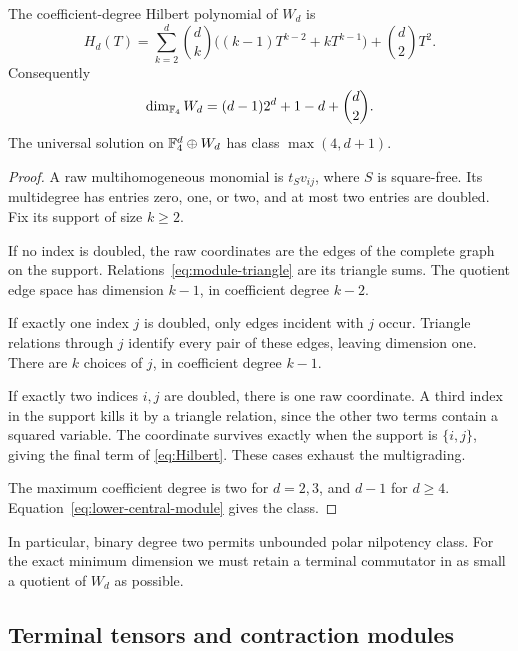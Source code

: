 \begin{proposition}\label{prop:Hilbert}
The coefficient-degree Hilbert polynomial of \(W_d\) is
\begin{equation}\label{eq:Hilbert}
 H_d(T)=\sum_{k=2}^d\binom dk
       \bigl((k-1)T^{k-2}+kT^{k-1}\bigr)+\binom d2T^2.
\end{equation}
Consequently
\[
 \dim_{\mathbb F_4}W_d=(d-1)2^d+1-d+\binom d2.
\]
The universal solution on \(\mathbb F_4^d\oplus W_d\) has class
\(\max(4,d+1)\).
\end{proposition}
\begin{proof}
A raw multihomogeneous monomial is \(t_Sv_{ij}\), where \(S\) is
square-free. Its multidegree has entries zero, one, or two, and at most
two entries are doubled. Fix its support of size \(k\ge2\).

If no index is doubled, the raw coordinates are the edges of the complete
graph on the support. Relations~\eqref{eq:module-triangle} are its triangle
sums. The quotient edge space has dimension \(k-1\), in coefficient
degree \(k-2\).

If exactly one index \(j\) is doubled, only edges incident with \(j\)
occur. Triangle relations through \(j\) identify every pair of these
edges, leaving dimension one. There are \(k\) choices of \(j\), in
coefficient degree \(k-1\).

If exactly two indices \(i,j\) are doubled, there is one raw coordinate.
A third index in the support kills it by a triangle relation, since the
other two terms contain a squared variable. The coordinate survives
exactly when the support is \(\{i,j\}\), giving the final term of
\eqref{eq:Hilbert}. These cases exhaust the multigrading.

The maximum coefficient degree is two for \(d=2,3\), and \(d-1\) for
\(d\ge4\). Equation~\eqref{eq:lower-central-module} gives the class.
\end{proof}

In particular, binary degree two permits unbounded polar nilpotency class.
For the exact minimum dimension we must retain a terminal commutator in
as small a quotient of \(W_d\) as possible.

\subsection{Terminal tensors and contraction modules}

